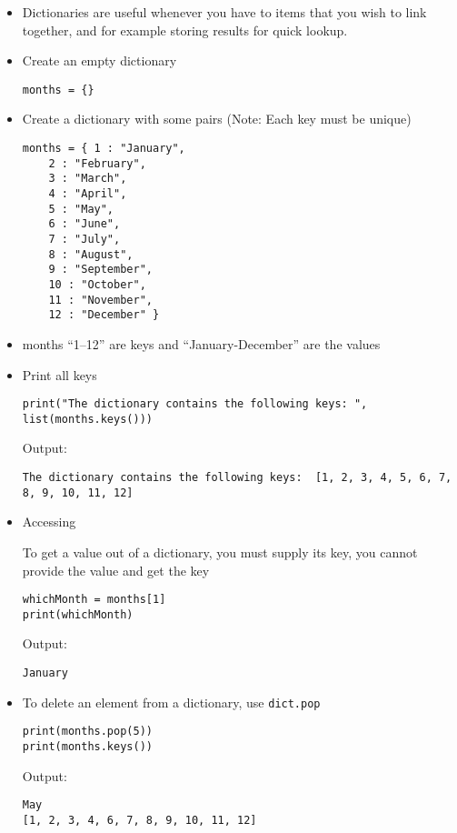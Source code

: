 \documentclass{article}
\begin{document}
\begin{itemize}
	\item Dictionaries are useful whenever you have to items that you wish to link together,
	and for example storing results for quick lookup.

	\item Create an empty dictionary
	\begin{verbatim}
months = {}
	\end{verbatim}

	\item Create a dictionary with some pairs (Note: Each key must be unique)

	\begin{verbatim}
months = { 1 : "January", 
    2 : "February", 
    3 : "March", 
    4 : "April", 
    5 : "May", 
    6 : "June", 
    7 : "July",
    8 : "August",
    9 : "September", 
    10 : "October", 
    11 : "November",
    12 : "December" } 
	\end{verbatim}


	\item months ``1--12'' are keys and ``January-December'' are the values

	\item Print all keys

	\begin{verbatim}
print("The dictionary contains the following keys: ", list(months.keys()))
	\end{verbatim}
Output:
	\begin{verbatim}
The dictionary contains the following keys:  [1, 2, 3, 4, 5, 6, 7, 8, 9, 10, 11, 12]
	\end{verbatim}

	\item Accessing

	To get a value out of a dictionary, you must supply its key, you cannot provide
	the value and get the key
	\begin{verbatim}
whichMonth = months[1]
print(whichMonth)
	\end{verbatim}
Output:
	\begin{verbatim}
January
	\end{verbatim}

	\item To delete an element from a dictionary, use {\tt dict.pop}


	\begin{verbatim}
print(months.pop(5))
print(months.keys())
	\end{verbatim}
Output:
	\begin{verbatim}
May
[1, 2, 3, 4, 6, 7, 8, 9, 10, 11, 12]
	\end{verbatim}


\end{itemize}
\end{document}

